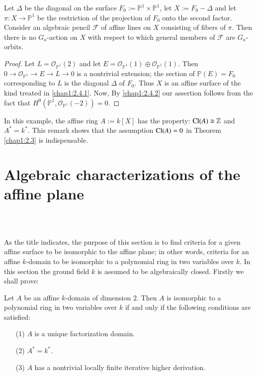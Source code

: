 \begin{example*}
Let $\Delta$ be the diagonal on the surface
$F_{0}:=\mathbb{P}^{1}\times\mathbb{P}^{1}$, let $X:=F_{0}-\Delta$ and
let $\pi:X\to \mathbb{P}^{1}$ be the restriction of the projection of
$F_{0}$ onto the second factor. Consider an algebraic pencil
$\mathscr{F}$ of affine lines on $X$ consisting of fibers of
$\pi$. Then there is no $G_{a}$-action on $X$ with respect to which
general members of $\mathscr{F}$ are $G_{a}$-orbits.
\end{example*}

\begin{proof}
Let $L=\mathscr{O}_{\mathbb{P}^{1}}(2)$ and let
$E=\mathscr{O}_{\mathbb{P}^{1}}(1)\oplus
\mathscr{O}_{\mathbb{P}^{1}}(1)$. Then $0\to
\mathscr{O}_{\mathbb{P}^{1}}\to E\to L\to 0$ is a nontrivial
extension; the section of $\mathbb{P}(E)=F_{0}$ corresponding to $L$
is the diagonal $\Delta$ of $F_{0}$. Thus $X$ is an affine surface of
the kind treated in \ref{chap1:2.4.1}. Now, By \ref{chap1:2.4.2} our assertion
follows from the fact that
$H^{0}(\mathbb{P}^{1},\mathscr{O}_{\mathbb{P}^{1}}(-2))=0$.
\end{proof}

In this example, the affine ring $A:=k[X]$ has the property:
$\operatorname{Cl}(A)\cong \mathbb{Z}$ and $A^{\ast}=k^{\ast}$. This remark shows
that the assumption $\operatorname{Cl}(A)=0$ in Theorem \ref{chap1:2.3} is
indispensable.


\section{Algebraic characterizations of the affine
  plane}\label{chap1:sec3}\pageoriginale\

\subsection{}\label{chap1:3.1}
As the title indicates, the purpose of this section is to find
criteria for a given affine surface to be isomorphic to the affine
plane; in other words, criteria for an affine $k$-domain to be
isomorphic to a polynomial ring in two variables over $k$. In this
section the ground field $k$ is assumed to be algebraically
closed. Firstly we shall prove:

\begin{theorem*}
Let $A$ be an affine $k$-domain of dimension $2$. Then $A$ is
isomorphic to a polynomial ring in two variables over $k$ if and only
if the following conditions are satisfied:
\begin{itemize}
\item[\rm(1)] $A$ is a unique factorization domain.

\item[\rm(2)] $A^{\ast}=k^{\ast}$.

\item[\rm(3)] $A$ has a nontrivial locally finite iterative higher
  derivation. 
\end{itemize}
\end{theorem*}


